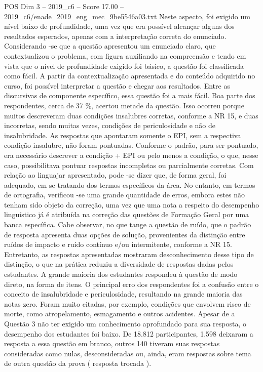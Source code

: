\begin{textsample}{POS Dim 3 – 2019\_c6 – Score 17.00 – 2019\_c6/enade\_2019\_eng\_mec\_9be5546a03.txt}
Neste aspecto, foi exigido um nível baixo de profundidade, uma vez que era possível alcançar alguns dos resultados esperados, apenas com a interpretação correta do enunciado.
Considerando -se que a questão apresentou um enunciado claro, que contextualizou o problema, com figura auxiliando na compreensão e tendo em vista que o nível de profundidade exigido foi básico, a questão foi classificada como fácil.
A partir da contextualização apresentada e do conteúdo adquirido no curso, foi possível interpretar a questão e chegar aos resultados.
Entre as discursivas de componente específico, essa questão foi a mais fácil.
Boa parte dos respondentes, cerca de 37 \%, acertou metade da questão.
Isso ocorreu porque muitos descreveram duas condições insalubres corretas, conforme a NR 15, e duas incorretas, sendo muitas vezes, condições de periculosidade e não de insalubridade.
As respostas que apontaram somente o EPI, sem a respectiva condição insalubre, não foram pontuadas.
Conforme o padrão, para ser pontuado, era necessário descrever a condição + EPI ou pelo menos a condição, o que, nesse caso, possibilitava pontuar respostas incompletas ou parcialmente corretas.
Com relação ao linguajar apresentado, pode -se dizer que, de forma geral, foi adequado, em se tratando dos termos específicos da área.
No entanto, em termos de ortografia, verificou -se uma grande quantidade de erros, embora estes não tenham sido objeto da correção, uma vez que uma nota a respeito do desempenho linguístico já é atribuída na correção das questões de Formação Geral por uma banca específica.
Cabe observar, no que tange a questão de ruído, que o padrão de resposta apresenta duas opções de solução, provenientes da distinção entre ruídos de impacto e ruído contínuo e/ou intermitente, conforme a NR 15.
Entretanto, as respostas apresentadas mostraram desconhecimento desse tipo de distinção, o que na prática reduziu a diversidade de respostas dadas pelos estudantes.
A grande maioria dos estudantes respondeu à questão de modo direto, na forma de itens.
O principal erro dos respondentes foi a confusão entre o conceito de insalubridade e periculosidade, resultando na grande maioria das notas zero.
Foram muito citadas, por exemplo, condições que envolvem risco de morte, como atropelamento, esmagamento e outros acidentes.
Apesar de a Questão 3 não ter exigido um conhecimento aprofundado para sua resposta, o desempenho dos estudantes foi baixo.
De 18.812 participantes, 1.598 deixaram a resposta a essa questão em branco, outros 140 tiveram suas respostas consideradas como nulas, desconsideradas ou, ainda, eram respostas sobre tema de outra questão da prova ( resposta trocada ).

\end{textsample}
